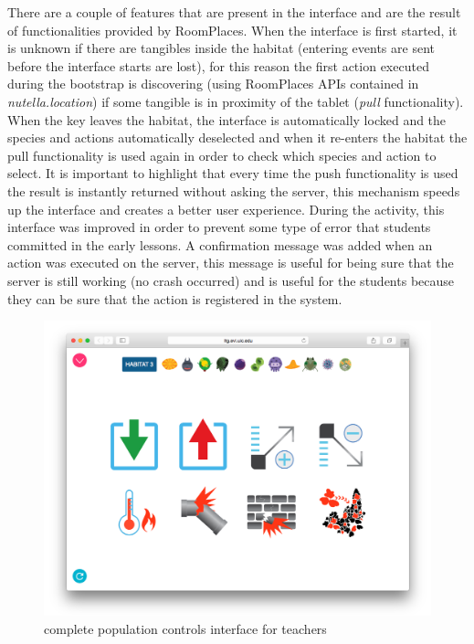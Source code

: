 There are a couple of features that are present in the interface and are the result of functionalities provided by RoomPlaces. When the interface is first started, it is unknown if there are tangibles inside the habitat (entering events are sent before the interface starts are lost), for this reason the first action executed during the bootstrap is discovering (using RoomPlaces APIs contained in \textit{nutella.location}) if some tangible is in proximity of the tablet (\textit{pull} functionality). When the key leaves the habitat, the interface is automatically locked and the species and actions automatically deselected and when it re-enters the habitat the pull functionality is used again in order to check which species and action to select. It is important to highlight that every time the push functionality is used the result is instantly returned without asking the server, this mechanism speeds up the interface and creates a better user experience. During the activity, this interface was improved in order to prevent some type of error that students committed in the early lessons. A confirmation message was added when an action was executed on the server, this message is useful for being sure that the server is still working (no crash occurred) and is useful for the students because they can be sure that the action is registered in the system.

\begin{figure}
\centering
\includegraphics[width=4.5in]{images/population-controls-teacher.png}
\caption{complete population controls interface for teachers}
\label{fig:population_controls_teachers}
\end{figure}


